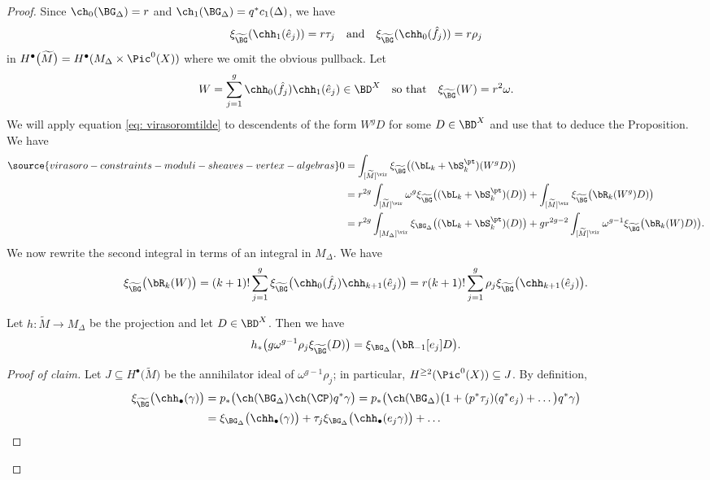 \begin{proof}
 Since $\ch_0(\BG_\Delta)=r$ and $\ch_1(\BG_\Delta)=q^\ast c_1(\Delta)$, we have
\[\xi_{\widetilde \BG}(\chh_1(\hat e_j))=r\tau_j \quad \textup{and}\quad \xi_{\widetilde \BG}(\chh_0(\hat f_j))=r\rho_j\]
in $H^\bullet\big(\widetilde M\big)=H^\bullet(M_\Delta\times \Pic^0(X))$ where we omit the obvious pullback. Let
\[W=\sum_{j=1}^g \chh_0(\hat f_j)\chh_1(\hat e_j)\in \BD^X\quad \textup{so that}\quad \xi_{\widetilde \BG}(W)=r^2\omega.\]
We will apply equation \eqref{eq: virasoromtilde} to descendents of the form $W^g D$ for some $D\in \BD^X$ and use that to deduce the Proposition. We have
\begin{align}\label{eq: virasoroMtilde2}
\source{virasoro-constraints-moduli-sheaves-vertex-algebras}
0&=\int_{[\widetilde M]^\vir}\xi_{\widetilde \BG}\big((\bL_k+\bS_k^\pt)(W^g D)\big)\\
&=r^{2g}\int_{[\widetilde M]^\vir}\omega^g \xi_{\widetilde \BG}\big((\bL_k+\bS_k^\pt)(D)\big)+\int_{[\widetilde M]^\vir}\xi_{\widetilde \BG}\big(\bR_k(W^g) D)\big)\nonumber\\
&=r^{2g}\int_{[M_\Delta]^\vir}\xi_{\BG_\Delta}\big((\bL_k+\bS_k^\pt)(D)\big)+gr^{2g-2}\int_{[\widetilde M]^\vir}\omega^{g-1}\xi_{\widetilde \BG}\big( \bR_k(W) D)\big).\nonumber
\end{align}
We now rewrite the second integral in terms of an integral in $M_\Delta$. We have
\[\xi_{\widetilde\BG}\big(\bR_k(W)\big)=(k+1)!\sum_{j=1}^g \xi_{\widetilde\BG}\big(\chh_0(\hat f_j)\chh_{k+1}(\hat e_j)\big)=r(k+1)!\sum_{j=1}^g \rho_j\xi_{\widetilde\BG}\big(\chh_{k+1}(\hat e_j)\big).\]
\begin{claim}
\notready
Let $h\colon \widetilde M\to M_\Delta$ be the projection and let $D\in \BD^X$. Then we have
\[h_\ast\big(g\omega^{g-1}\rho_j\xi_{\widetilde \BG}(D)\big)=\xi_{\BG_\Delta}\big(\bR_{-1}[e_j]D\big).\]
\end{claim}\begin{proof}[Proof of claim]
Let $J\subseteq H^\bullet\big(\widetilde M\big)$ be the annihilator ideal of $\omega^{g-1}\rho_j$; in particular, $H^{\geq 2}(\Pic^0(X))\subseteq J$. By definition,
\begin{align*}
\xi_{\widetilde \BG}\big(\chh_\bullet(\gamma)\big)&=p_\ast\big(\ch(\BG_\Delta)\ch(\CP)q^\ast \gamma\big)=p_\ast\big(\ch(\BG_\Delta)\big(1+(p^\ast \tau_j) (q^\ast e_j)+\ldots\big)q^\ast \gamma\big)\\
&=\xi_{\BG_\Delta}\big(\chh_\bullet(\gamma)\big)+\tau_j\xi_{\BG_\Delta}\big(\chh_\bullet(e_j\gamma)\big)+\ldots

\end{align*}
\end{proof}
\end{proof}
